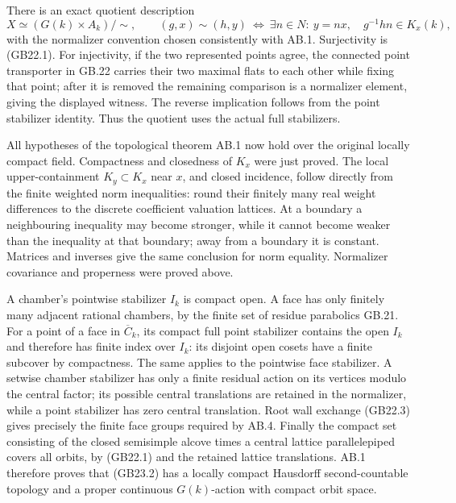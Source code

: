 \documentclass[
  11pt,
]{article}
\begin{document}
There is an exact quotient description \[
              X\simeq
             (G(k)\times A_k)/\!\sim,\qquad
 (g,x)\sim(h,y)\ \Longleftrightarrow\
 \exists n\in N:\ y=nx,\quad g^{-1}hn\in K_x(k),             \tag{GB23.2}
\] with the normalizer convention chosen consistently with AB.1.
Surjectivity is (GB22.1). For injectivity, if the two represented points
agree, the connected point transporter in GB.22 carries their two
maximal flats to each other while fixing that point; after it is removed
the remaining comparison is a normalizer element, giving the displayed
witness. The reverse implication follows from the point stabilizer
identity. Thus the quotient uses the actual full stabilizers.

All hypotheses of the topological theorem AB.1 now hold over the
original locally compact field. Compactness and closedness of \(K_x\)
were just proved. The local upper-containment \(K_y\subset K_x\) near
\(x\), and closed incidence, follow directly from the finite weighted
norm inequalities: round their finitely many real weight differences to
the discrete coefficient valuation lattices. At a boundary a
neighbouring inequality may become stronger, while it cannot become
weaker than the inequality at that boundary; away from a boundary it is
constant. Matrices and inverses give the same conclusion for norm
equality. Normalizer covariance and properness were proved above.

A chamber's pointwise stabilizer \(I_k\) is compact open. A face has
only finitely many adjacent rational chambers, by the finite set of
residue parabolics GB.21. For a point of a face in \(\overline C_k\),
its compact full point stabilizer contains the open \(I_k\) and
therefore has finite index over \(I_k\): its disjoint open cosets have a
finite subcover by compactness. The same applies to the pointwise face
stabilizer. A setwise chamber stabilizer has only a finite residual
action on its vertices modulo the central factor; its possible central
translations are retained in the normalizer, while a point stabilizer
has zero central translation. Root wall exchange (GB22.3) gives
precisely the finite face groups required by AB.4. Finally the compact
set consisting of the closed semisimple alcove times a central lattice
parallelepiped covers all orbits, by (GB22.1) and the retained lattice
translations. AB.1 therefore proves that (GB23.2) has a locally compact
Hausdorff second-countable topology and a proper continuous
\(G(k)\)-action with compact orbit space.
\end{document}
